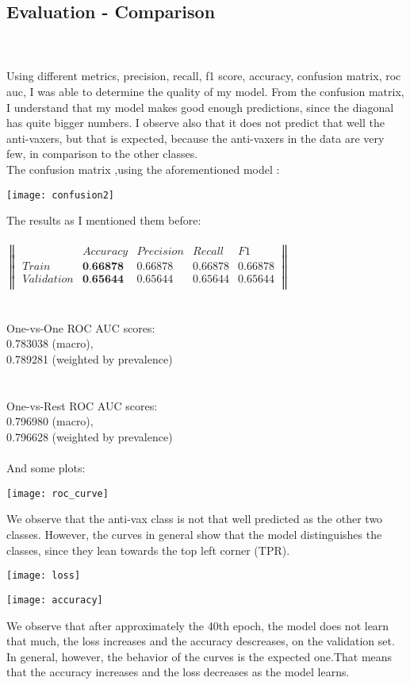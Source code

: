 \documentclass{article}
\begin{document}
\subsection{Evaluation - Comparison}
\\ \\
Using different metrics, precision, recall, f1 score, accuracy, confusion matrix, roc auc, I was able to determine the quality of my model. From the confusion matrix, I understand that my model makes good enough predictions, since the diagonal has quite bigger numbers. I observe also that it does not predict that well the anti-vaxers, but that is expected, because the anti-vaxers in the data are very few, in comparison to the other classes. \\The confusion matrix ,using the aforementioned model :
\begin{center}
\texttt{[image: confusion2]}
\end{center}
The results as I mentioned them before: \\ \\
$
\begin{Vmatrix}
& Accuracy & Precision &  Recall & F1\\
Train & \textbf{0.66878} & 0.66878 &0.66878 & 0.66878\\
Validation & \textbf{0.65644} & 0.65644 & 0.65644 & 0.65644\\
\end{Vmatrix} 
$ \\ \\ \\
One-vs-One ROC AUC scores: \\
0.783038 (macro), \\
0.789281 (weighted by prevalence) \\
\\ \\
One-vs-Rest ROC AUC scores: \\
0.796980 (macro), \\
0.796628 (weighted by prevalence) \\ \\
And some plots:
\begin{center}
\texttt{[image: roc\_curve]}
\end{center}
We observe that the anti-vax class is not that well predicted as the other two classes.
However, the curves in general show that the model distinguishes the classes, since they lean towards the top left corner (TPR).
\begin{center}
\texttt{[image: loss]}
\end{center}
\begin{center}
\texttt{[image: accuracy]}
\end{center}
We observe that after approximately the 40th epoch, the model does not learn that much, the loss increases and the accuracy descreases, on the validation set.
In general, however, the behavior of the curves is the expected one.That means that the accuracy increases and the loss decreases as the model learns.
\end{document}
